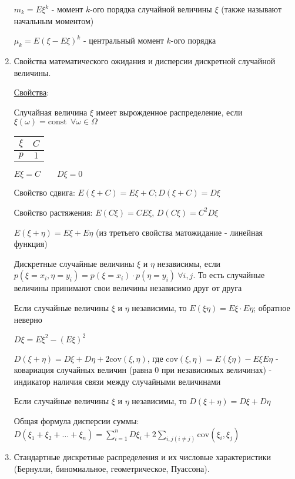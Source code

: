 \begin{enumerate}
    $m_k = E\xi^k$ - момент $k$-ого порядка случайной величины $\xi$ (также называют начальным моментом)

    $\mu_k = E(\xi - E\xi)^k$ - центральный момент $k$-ого порядка

    \item Свойства математического ожидания и дисперсии дискретной случайной величины.

    \hyperlink{expectedvalueandvarianceproperties}{Свойства}: 

     Случайная величина $\xi$ имеет вырожденное распределение, если $\xi(\omega) = \mathrm{const} \ \ \forall \omega \in \Omega$

    \begin{tabular}{c|c}
        $\xi$ & $C$ \\
        \hline
        $p$   & $1$
    \end{tabular}

    $E\xi = C \qquad D\xi = 0$

     Свойство сдвига: $E(\xi + C) = E\xi + C; D (\xi + C) = D\xi$

     Свойство растяжения: $E(C\xi) = CE\xi$, $D(C\xi) = C^2 D\xi$

     $E(\xi + \eta) = E\xi + E\eta$ (из третьего свойства матожидание - линейная функция)

    \Def Дискретные случайные величины $\xi$ и $\eta$ независимы, если $p(\xi = x_i, \eta = y_i) = p(\xi = x_i) \cdot p(\eta = y_i) \ \forall i, j$.
    То есть случайные величины принимают свои величины независимо друг от друга

     Если случайные величины $\xi$ и $\eta$ независимы, то $E(\xi \eta) = E\xi \cdot E\eta$; обратное неверно

     $D\xi = E\xi^2 - (E\xi)^2$

    \Def $D(\xi + \eta) = D\xi + D\eta + 2\mathrm{cov} (\xi, \eta)$,
    где $\mathrm{cov}(\xi, \eta) = E(\xi\eta) - E\xi E\eta$ - ковариация случайных величин (равна 0 при независимых величинах) - индикатор наличия связи между случайными величинами

     Если случайные величины $\xi$ и $\eta$ независимы, то $D(\xi + \eta) = D\xi + D\eta$

     Общая формула дисперсии суммы: $D(\xi_1 + \xi_2 + \dots + \xi_n) = \sum_{i = 1}^n D \xi_i + 2\sum_{i, j (i \neq j)} \mathrm{cov} (\xi_i, \xi_j)$

    \item Стандартные дискретные распределения и их числовые характеристики (Бернулли, биномиальное, геометрическое, Пуассона).
    

\end{enumerate}

